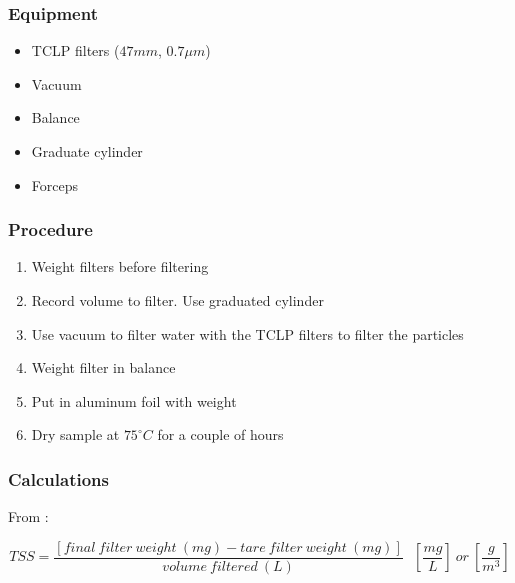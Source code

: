 \begin{appendices}
\subsubsection{Equipment}
\begin{itemize}[itemsep=2pt,parsep=2pt]

  \item TCLP filters ($47 mm$, $0.7\mu m$)
  \item Vacuum
  \item Balance
  \item Graduate cylinder
  \item Forceps

\end{itemize}

\subsubsection{Procedure}
\begin{enumerate}[itemsep=2pt,parsep=2pt]
  \item Weight filters before filtering
  \item Record volume to filter. Use graduated cylinder
  \item Use vacuum to filter water with the TCLP filters to filter the particles
  \item Weight filter in balance
  \item Put in aluminum foil with weight
  \item Dry sample at $75^\circ C$ for a couple of hours
\end{enumerate}

\subsubsection{Calculations}
From \citet{Tyler2013_SPM_protocol}:

\begin{equation}
TSS = \frac{[final~filter~weight~(mg) - tare~filter~weight~(mg)]}{volume~filtered~(L)}~~~\left[\frac{mg}{L}\right]~or~\left[\frac{g}{m^3}\right]
\end{equation}




\end{appendices}
